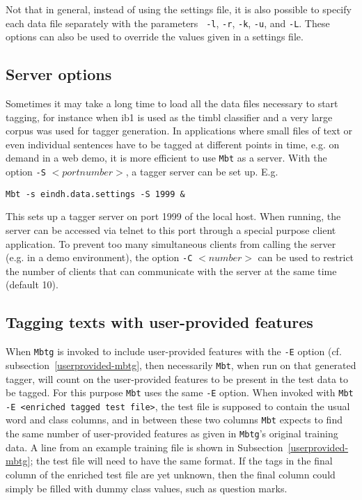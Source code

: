 \documentclass{report}
\begin{document}
Not that in general, instead of using the settings file, it is also
possible to specify each data file separately with the parameters {\tt
  -l}, {\tt -r}, {\tt -k}, {\tt -u}, and {\tt -L}. These options can
also be used to override the values given in a settings file.


\subsection{Server options}

Sometimes it may take a long time to load all the data files necessary
to start tagging, for instance when {\sc ib1} is used as the {\sc
timbl} classifier and a very large corpus was used for tagger
generation. In applications where small files of text or even
individual sentences have to be tagged at different points in time,
e.g. on demand in a web demo, it is more efficient to use {\tt Mbt} as
a server. With the option {\tt -S} $<portnumber>$, a tagger server can be
set up. E.g.

{\small
\begin{verbatim}
Mbt -s eindh.data.settings -S 1999 &
\end{verbatim}
}

This sets up a tagger server on port 1999 of the local host. When
running, the server can be accessed via telnet to this port through a
special purpose client application. To prevent too many simultaneous
clients from calling the server (e.g. in a demo environment), the
option {\tt -C} $<number>$ can be used to restrict the number of
clients that can communicate with the server at the same time (default
10).


\subsection{Tagging texts with user-provided features}
\label{userprovided-mbt}

When {\tt Mbtg} is invoked to include user-provided features with the
{\tt -E} option (cf. subsection~\ref{userprovided-mbtg}, then
necessarily {\tt Mbt}, when run on that generated tagger, will count
on the user-provided features to be present in the test data to be
tagged. For this purpose {\tt Mbt} uses the same {\tt -E} option. When
invoked with {\tt Mbt -E <enriched tagged test file>}, the test file
is supposed to contain the usual word and class columns, and in
between these two columns {\tt Mbt} expects to find the same number of
user-provided features as given in {\tt Mbtg}'s original training
data. A line from an example training file is shown in
Subsection~\ref{userprovided-mbtg}; the test file will need to have
the same format. If the tags in the final column of the enriched test
file are yet unknown, then the final column could simply be filled
with dummy class values, such as question marks.
\end{document}
